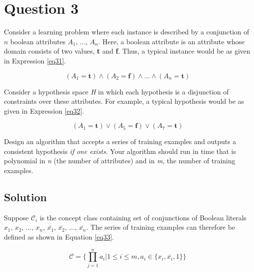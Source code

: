 
\section*{Question 3}

Consider a learning problem where each instance is described by a conjunction of $n$ boolean attributes $A_1$, ..., $A_n$.
Here, a boolean attribute is an attribute whose domain consists of two values, \textbf{t} and \textbf{f}.
Thus, a typical instance would be as given in Expression \ref{eq31}.

\begin{equation}\label{eq31}
(A_1 = \textbf{t}) \wedge (A_2 = \textbf{f}) \wedge ... \wedge (A_n = \textbf{t})
\end{equation}

Consider a hypothesis space \textit{H} in which each hypothesis is a disjunction of constraints over these attributes.
For example, a typical hypothesis would be as given in Expression \ref{eq32}.

\begin{equation}\label{eq32}
(A_1 = \textbf{t}) \vee (A_5 = \textbf{f}) \vee (A_7 = \textbf{t})
\end{equation}

Design an algorithm that accepts a series of training examples and outputs a consistent hypothesis \textit{if one exists}.
Your algorithm should run in time that is polynomial in \textit{n} (the number of attributes) and in \textit{m}, the number of training examples.

\subsection*{Solution}

Suppose $\mathcal{C}_i$ is the concept class containing set of conjunctions of Boolean literals $x_1$, $x_2$, ..., $x_n$, $\bar{x_1}$, $\bar{x_2}$, ..., $\bar{x_n}$.
The series of training examples can therefore be defined as shown in Equation \ref{eq33}.

\begin{equation}\label{eq33}
\mathcal{C} = \{\prod_{j=1}^{n} a_i | 1 \leq i \leq m, a_i \in \{x_i, \bar{x_i}, 1\}\}
\end{equation}

